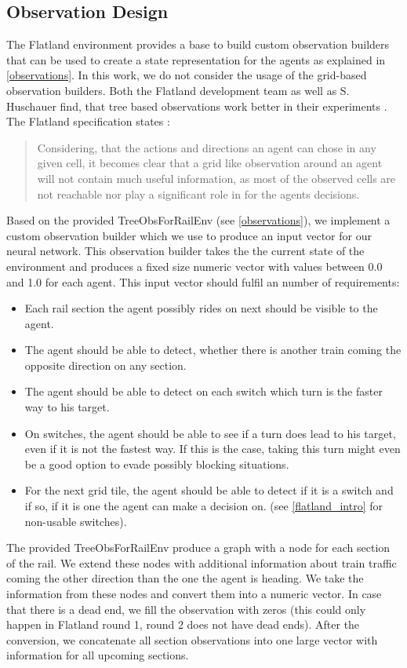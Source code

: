 \subsection*{Observation Design}\label{enhanced_observations}
The Flatland environment provides a base to build custom observation builders that can be used to create a state representation for the agents as explained in \autoref{observations}. In this work, we do not consider the usage of the grid-based observation builders.
Both the Flatland development team as well as S. Huschauer find, that tree based observations work better in their experiments \cite{flatlandstephan}. The Flatland specification states \cite{flatland_spec}:
\begin{quote}
Considering, that the actions and directions an agent can chose in any given cell, it becomes clear that a grid like observation around an agent will not contain much useful information, as most of the observed cells are not reachable nor play a significant role in for the agents decisions.
\end{quote}
Based on the provided TreeObsForRailEnv (see \autoref{observations}), we implement a custom observation builder which we use to produce an input vector for our neural network. This observation builder takes the the current state of the environment and produces a fixed size numeric vector with values between 0.0 and 1.0 for each agent. This input vector should fulfil an number of requirements:
\begin{itemize}
	\item Each rail section the agent possibly rides on next should be visible to the agent.
	\item The agent should be able to detect, whether there is another train coming the opposite direction on any section.
	\item The agent should be able to detect on each switch which turn is the faster way to his target.
	\item On switches, the agent should be able to see if a turn does lead to his target, even if it is not the fastest way. If this is the case, taking this turn might even be a good option to evade possibly blocking situations.
	\item For the next grid tile, the agent should be able to detect if it is a switch and if so, if it is one the agent can make a decision on. (see \autoref{flatland_intro} for non-usable switches).
\end{itemize}
The provided TreeObsForRailEnv produce a graph with a node for each section of the rail. We extend these nodes with additional information about train traffic coming the other direction than the one the agent is heading. We take the information from these nodes and convert them into a numeric vector. In case that there is a dead end, we fill the observation with zeros (this could only happen in Flatland round 1, round 2 does not have dead ends). After the conversion, we concatenate all section observations into one large vector with information for all upcoming sections.\\

